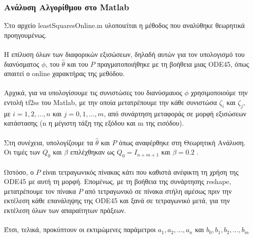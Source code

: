\documentclass[12pt]{article}
\begin{document}
\subsubsection{Ανάλυση Αλγορίθμου στο Matlab}
Στο αρχείο leastSquaresOnline.m υλοποιείται η μέθοδος που αναλύθηκε θεωρητικά προηγουμένως.
\\ \\
Η επίλυση όλων των διαφορικών εξισώσεων, δηλαδή αυτών για τον υπολογισμό του διανύσματος $\phi$,  του $\hat{\theta}$ και του $P$ πραγματοποιήθηκε με τη βοήθεια μιας ODE45, όπως απαιτεί ο online χαρακτήρας της μεθόδου.
\\ \\
Αρχικά, για να υπολογίσουμε τις συνιστώσες του διανύσμαυος $\phi$ χρησιμοποιούμε την εντολή tf2ss του Matlab, με την οποία μετατρέπουμε την κάθε συνιστώσα $\zeta_i$ και $\zeta_j$, με $i=1,2,...,n$ και $j=0,1,...,m$, από συνάρτηση μεταφοράς σε μορφή εξισώσεων κατάστασης (n η μέγιστη τάξη της εξόδου και m της εισόδου).
\\ \\
Στη συνέχεια, υπολογίζουμε τα $\hat{\theta}$ και $P$ όπως αναφέρθηκε στη Θεωρητική Ανάλυση. Οι τιμές των $Q_0$ και $\beta$ επιλέχθηκαν ως $Q_0=Ι_{n+m+1}$ και $\beta=0.2$ .
\\ \\
Ωστόσο, ο $P$ είναι τετραγωνικός πίνακας κάτι που καθιστά ανέφικτη τη χρήση της ODE45 με αυτή τη μορφή. Επομένως, με τη βοήθεια της συνάρτησης reshape, μετατρέπουμε τον πίνακα $P$ από τετραγωνικό σε πίνακα στήλη αμέσως πριν την εκτέλεση κάθε επανάληψης της ODE45 και ξανά σε τετραγωνικό μετά, για την εκτέλεση όλων των απαραίτητων πράξεων.
\\ \\
Έτσι, τελικά, προκύπτουν οι εκτιμώμενες παράμετροι $a_1, a_2, ... , a_n $ και $b_0 , b_1, b_2, ... , b_m $
\end{document}
